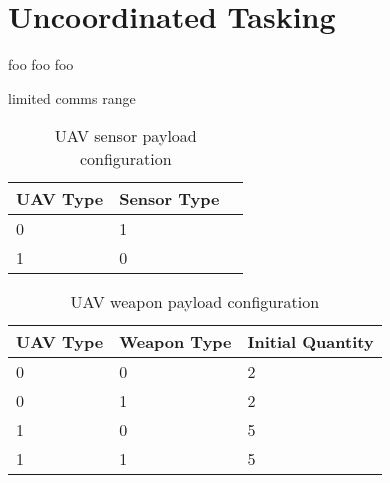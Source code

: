 \section{Uncoordinated Tasking}
foo foo foo

limited comms range

\begin{table}[h]
	\caption{UAV sensor payload configuration}
	\centering
	\label{tab:uavSensorMap}
	\begin{tabular}{|p{1cm}|p{1cm}|p{1cm}|}
		\hline
		UAV Type & Sensor Type\\ \hline
		0 & 1 \\
		1 & 0 \\
		\hline
	\end{tabular}
\end{table}


\begin{table}[h]
	\caption{UAV weapon payload configuration}
	\centering
	\label{tab:uavWpnMap}
	\begin{tabular}{|p{1cm}|p{1.5cm}|p{2cm}|}
		\hline
		UAV Type & Weapon Type & Initial Quantity\\ \hline
		0 & 0 & 2 \\
		0 & 1 & 2 \\
		1 & 0 & 5 \\
		1 & 1 & 5 \\
		\hline
	\end{tabular}
\end{table}
